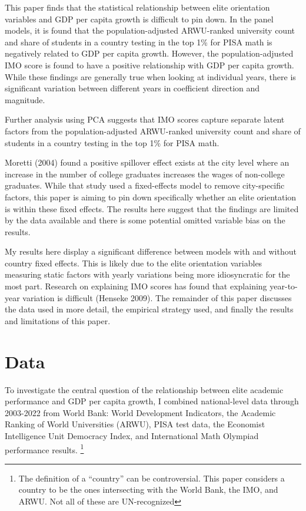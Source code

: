 \documentclass[11pt]{article}
\begin{document}
This paper finds that the statistical relationship between elite orientation variables and GDP per capita growth is difficult to pin down. In the panel models, it is found that the population-adjusted ARWU-ranked university count and share of students in a country testing in the top 1\% for PISA math is negatively related to GDP per capita growth. However, the population-adjusted IMO score is found to have a positive relationship with GDP per capita growth. While these findings are generally true when looking at individual years, there is significant variation between different years in coefficient direction and magnitude.

Further analysis using PCA suggests that IMO scores capture separate latent factors from the population-adjusted ARWU-ranked university count and share of students in a country testing in the top 1\% for PISA math.

Moretti (2004) found a positive spillover effect exists at the city level where an increase in the number of college graduates increases the wages of non-college graduates. While that study used a fixed-effects model to remove city-specific factors, this paper is aiming to pin down specifically whether an elite orientation is within these fixed effects. The results here suggest that the findings are limited by the data available and there is some potential omitted variable bias on the results.

My results here display a significant difference between models with and without country fixed effects. This is likely due to the elite orientation variables measuring static factors with yearly variations being more idiosyncratic for the most part. Research on explaining IMO scores has found that explaining year-to-year variation is difficult (Henseke 2009).
The remainder of this paper discusses the data used in more detail, the empirical strategy used, and finally the results and limitations of this paper.

\section{Data}
To investigate the central question of the relationship between elite academic performance and GDP per capita growth, I combined national-level data through 2003-2022 from World Bank: World Development Indicators, the Academic Ranking of World Universities (ARWU), PISA test data, the Economist Intelligence Unit Democracy Index, and International Math Olympiad performance results. \footnote{The definition of a ``country'' can be controversial. This paper considers a country to be the ones intersecting with the World Bank, the IMO, and ARWU. Not all of these are UN-recognized}
\end{document}

